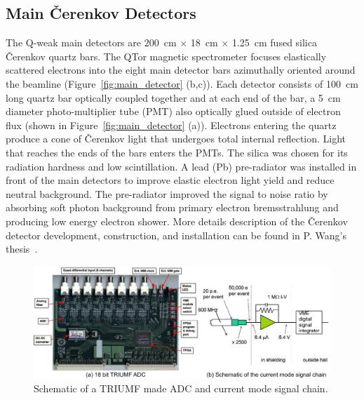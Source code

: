\subsection{Main \v{C}erenkov Detectors}%
\label{Main Cerenkov Detectors}

The Q-weak main detectors are 200~cm $\times$ 18~cm $\times$ 1.25~cm fused silica \v{C}erenkov quartz bars. The QTor magnetic spectrometer focuses elastically scattered electrons into the eight main detector bars azimuthally oriented around the beamline (Figure~\ref{fig:main_detector} (b,c)). Each detector consists of 100~cm long quartz bar optically coupled together and at each end of the bar, a 5~cm diameter photo-multiplier tube (PMT) also optically glued outside of electron flux (shown in Figure~\ref{fig:main_detector} (a)). Electrons entering the quartz produce a cone of \v{C}erenkov light that undergoes total internal reflection. Light that reaches the ends of the bars enters the PMTs. The silica was chosen for its radiation hardness and low scintillation. A lead (Pb) pre-radiator was installed in front of the main detectors to improve elastic electron light yield and reduce neutral background. The pre-radiator improved the signal to noise ratio by absorbing soft photon background from primary electron bremsstrahlung and producing low energy electron shower. More details description of the \v{C}erenkov detector development, construction, and installation can be found in P. Wang's thesis~\cite{peiqing_qweak}.


\begin{singlespace}
\begin{figure}[!h]
	\begin{center}
	\includegraphics[width=15.0cm]{figures/adc}
	\caption
	{Schematic of a TRIUMF made ADC and current mode signal chain.}
	\label{fig:adc}
	\end{center}
\end{figure}
\end{singlespace}


